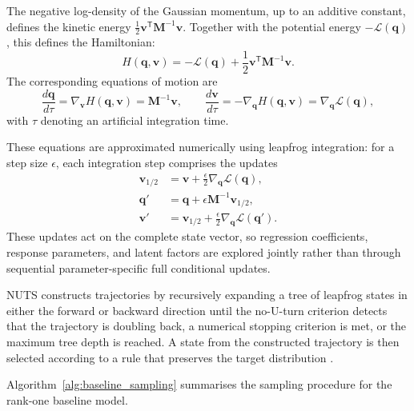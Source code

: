 \documentclass[pdftex,12pt,openright,a4paper,oneside]{book}
\begin{document}
The negative log-density of the Gaussian momentum,
up to an additive constant, defines the kinetic
energy $\frac{1}{2}\mathbf{v}^{\mathsf T}
\mathbf{M}^{-1}\mathbf{v}$.
Together with the potential energy
$-\mathcal{L}(\mathbf{q})$, this defines the
Hamiltonian:
\begin{equation}
H(\mathbf{q},\mathbf{v})
=
-\mathcal{L}(\mathbf{q})
+\frac{1}{2}\mathbf{v}^{\mathsf T}
\mathbf{M}^{-1}\mathbf{v}.
\end{equation}
The corresponding equations of motion are
\begin{equation*}
\frac{d\mathbf{q}}{d\tau}
=
\nabla_{\mathbf{v}}H(\mathbf{q},\mathbf{v})
=
\mathbf{M}^{-1}\mathbf{v},
\qquad
\frac{d\mathbf{v}}{d\tau}
=
-\nabla_{\mathbf{q}}H(\mathbf{q},\mathbf{v})
=
\nabla_{\mathbf{q}}\mathcal{L}(\mathbf{q}),
\end{equation*}
with $\tau$ denoting an artificial integration time.

These equations are approximated numerically using
leapfrog integration: for a step size $\epsilon$,
each integration step comprises the updates
\begin{equation}
\begin{aligned}
 \mathbf{v}_{1/2}
 &=
 \mathbf{v}
 +\frac{\epsilon}{2}
 \nabla_{\mathbf{q}}\mathcal{L}(\mathbf{q}),\\
 \mathbf{q}'
 &=
 \mathbf{q}
 +\epsilon\mathbf{M}^{-1}\mathbf{v}_{1/2},\\
 \mathbf{v}'
 &=
 \mathbf{v}_{1/2}
 +\frac{\epsilon}{2}
 \nabla_{\mathbf{q}}\mathcal{L}(\mathbf{q}').
\end{aligned}
\label{eq:leapfrog_updates}
\end{equation}
These updates act on the complete state vector,
so regression coefficients, response parameters,
and latent factors are explored jointly rather
than through sequential parameter-specific
full conditional updates.

NUTS constructs trajectories by recursively expanding
a tree of leapfrog states in either the forward or backward
direction until the no-U-turn
criterion detects that the trajectory is doubling
back, a numerical stopping criterion is met,
or the maximum tree depth is reached.
A state from the constructed trajectory is then
selected according to a rule that preserves the
target distribution \citep{hoffman2014no}.

Algorithm~\ref{alg:baseline_sampling} summarises
the sampling procedure for the rank-one baseline model.
\end{document}
